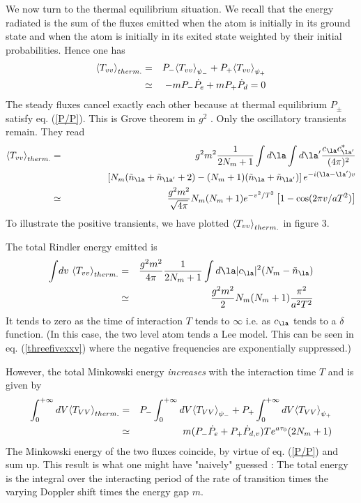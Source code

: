We now turn to the thermal equilibrium situation.
We recall that the energy radiated is the sum of the fluxes
emitted when the atom is initially
in its ground state
and
when the atom is initially in its
exited state weighted by
their initial probabilities.
Hence one has
 \begin{eqnarray}
\mbox{$ \langle T_{vv} \rangle $}_{therm.} &=&
P_-  \mbox{$ \langle T_{vv} \rangle $}_{\psi_-} +  P_+  \mbox{$ \langle T_{vv} \rangle $}_{\psi_+}
 \nonumber\\ &\simeq&
-m P_-  \dot P_{e} + m P_+  \dot P_{d} =  0
\label{rayxx}
\end{eqnarray}
The steady fluxes cancel exactly each other because at thermal
equilibrium $P_{\pm}$ satisfy eq. (\ref{P/P}).
This is Grove theorem in $g^2$ \cite{Grove}\cite{mpbrsg}.
 Only the oscillatory transients remain.
They read
\begin{eqnarray}
 \bk{T_{vv}}_{therm.} &=&  g^2 m^2
{1 \over 2 N_m +1}
  \int d\la \int d\la^\prime  {c_\la
c_{\la^\prime}^*
 \over (4 \pi)^2}
\nonumber\\
&\ &\quad\quad
\quad\quad
\left[
N_m ( \tilde n_\la +\tilde n_{\la^\prime} + 2 )
- ( N_m + 1)  (\tilde n_\la +\tilde n_{\la^\prime} )
\right ]
e^{-i(\la- \la^\prime) v}
\nonumber\\
 &\simeq&  {g^2 m^2 \over  \sqrt{4 \pi}}
N_m ( N_m + 1) e^{-v^2/T^2} \left[
1 - \cos (2 \pi v/ aT^2)\right ]
\label{rayxxi}
\end{eqnarray}
 To illustrate the positive transients, we have plotted
$\mbox{$ \langle T_{vv} \rangle $}_{therm.}$ in figure 3.

The total Rindler
energy emitted is
\begin{eqnarray}
 \int\! dv\ \bk{T_{vv}}_{therm.}&=&
{ g^2 m^2
\over 4 \pi}{1 \over 2 N_m + 1}
 \int d\la \vert c_\la \vert^2 (N_m - \tilde n_\la )\nonumber\\
&\simeq& {g^2 m^2 \over  2} N_m ( N_m + 1) { \pi^2 \over a^2 T^2}
\label{rayxxii}
\end{eqnarray}
It tends to zero
 as the time of interaction $T$
tends to $\infty$ i.e. as $c_\la$ tends to a $\delta$ function.
(In this case, the two level atom tends a Lee model. This can be seen
in eq. (\ref{threefivexxv}) where the negative frequencies are exponentially
suppressed.)

However, the total Minkowski energy
{\it increases}
with the interaction time $T$ and is
given by
 \begin{eqnarray} \int^{+\infty}_0 dV \mbox{$ \langle T_{VV} \rangle $}_{therm.} &=&
P_-  \int^{+\infty}_0 dV \mbox{$ \langle T_{VV} \rangle $}_{\psi_-} +  P_+
\int^{+\infty}_0 dV \mbox{$ \langle T_{VV} \rangle $}_{\psi_+}
\nonumber\\ &\simeq&
m( P_-  \dot P_{e} + P_+  \dot P_{d,v}) T e^{a \tau_0}(2 N_m + 1)
\label{rayxxiii}
\end{eqnarray}
The Minkowski energy of the two fluxes coincide, by virtue of
eq. (\ref{P/P}) and sum up.
This result is what one might have "naively" guessed :
The total energy is the integral over the interacting period
of the rate of transition times the varying Doppler shift
times the energy gap $m$.

